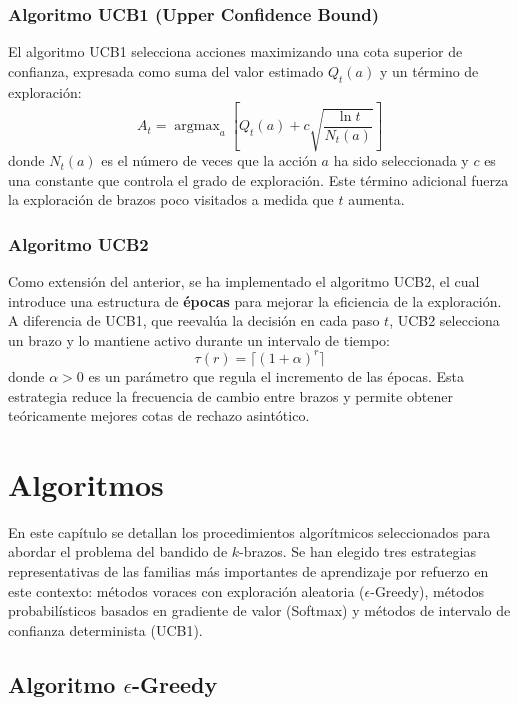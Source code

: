 \subsubsection{Algoritmo UCB1 (Upper Confidence Bound)}
El algoritmo UCB1 selecciona acciones maximizando una cota superior de confianza, expresada como suma del valor estimado $Q_t(a)$ y un término de exploración:
\begin{equation*}
    A_t = \operatorname{argmax}_a \left[ Q_t(a) + c \sqrt{\frac{\ln t}{N_t(a)}} \right]
\end{equation*}
donde $N_t(a)$ es el número de veces que la acción $a$ ha sido seleccionada y $c$ es una constante que controla el grado de exploración. Este término adicional fuerza la exploración de brazos poco visitados a medida que $t$ aumenta.

\subsubsection{Algoritmo UCB2}
Como extensión del anterior, se ha implementado el algoritmo UCB2, el cual introduce una estructura de \textbf{épocas} para mejorar la eficiencia de la exploración. A diferencia de UCB1, que reevalúa la decisión en cada paso $t$, UCB2 selecciona un brazo y lo mantiene activo durante un intervalo de tiempo:
\begin{equation*}
    \tau(r) = \lceil (1+\alpha)^r \rceil
\end{equation*}
donde $\alpha > 0$ es un parámetro que regula el incremento de las épocas. Esta estrategia reduce la frecuencia de cambio entre brazos y permite obtener teóricamente mejores cotas de rechazo asintótico.

\section{Algoritmos}

En este capítulo se detallan los procedimientos algorítmicos seleccionados para abordar el problema del bandido de $k$-brazos. Se han elegido tres estrategias representativas de las familias más importantes de aprendizaje por refuerzo en este contexto: métodos voraces con exploración aleatoria ($\epsilon$-Greedy), métodos probabilísticos basados en gradiente de valor (Softmax) y métodos de intervalo de confianza determinista (UCB1).

\subsection{Algoritmo $\epsilon$-Greedy}


